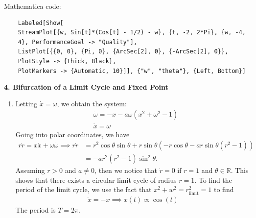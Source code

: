 \documentclass{article}
\theoremstyle{definition}
\begin{document}
\begin{enumerate}[label=(\alph*)]
	Mathematica code:
	\begin{lstlisting}
	Labeled[Show[
	StreamPlot[{w, Sin[t]*(Cos[t] - 1/2) - w}, {t, -2, 2*Pi}, {w, -4, 
	4}, PerformanceGoal -> "Quality"], 
	ListPlot[{{0, 0}, {Pi, 0}, {ArcSec[2], 0}, {-ArcSec[2], 0}}, 
	PlotStyle -> {Thick, Black}, 
	PlotMarkers -> {Automatic, 10}]], {"w", "theta"}, {Left, Bottom}]
	\end{lstlisting}
	
	
\end{enumerate}


\newpage

\noindent \textbf{4. Bifurcation of a Limit Cycle and Fixed Point}

\begin{enumerate}[label=(\alph*)]
	\item Letting $\dot x = \omega$, we obtain the system: 
	\begin{align*}
	&\dot \omega = -x - a \omega(x^2 + \omega^2 - 1)\\
	&\dot x = \omega
	\end{align*}
	Going into polar coordinates, we have
	\begin{align*}
	r\dot r = x\dot x + \omega \dot \omega \implies 
	r\dot r 
	&= r^2\cos\theta\sin\theta + r\sin\theta (-r\cos\theta - a r\sin\theta (r^2-1)) \\
	&= -ar^2(r^2-1)\sin^2\theta.
	\end{align*}
	Assuming $r>0$ and $a\neq 0$, then we notice that $\dot r = 0$ if $r=1$ and $\theta\in \mathbb{R}$. This shows that there exists a circular limit cycle of radius $r=1$. To find the period of the limit cycle, we use the fact that $x^2 + w^2 = r_\text{limit}^2 = 1$ to find 
	\begin{align*}
	\ddot x = - x \implies x(t) \propto  \cos(t) 
	\end{align*}
	The period is $\boxed{T = 2\pi}$. 
	
	
	

\end{enumerate}
\end{document}
